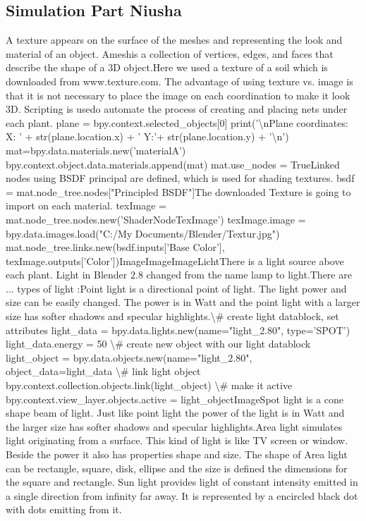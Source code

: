 \graphicspath{{members/nh/figures/}}

\subsection{Simulation Part Niusha}


A texture appears on the surface of the meshes and representing the look and material of an object. Ameshis a collection of vertices, edges, and faces that describe the shape of a 3D object.Here we used a texture of a soil which is downloaded from www.texture.com. The advantage of using texture vs. image is that it is not necessary to place the image on each coordination to make it look 3D. Scripting is usedo automate the process of creating and placing nets under each plant. plane = bpy.context.selected_objects[0] print('\textbackslash nPlane coordinates: X: ' + str(plane.location.x) + ' Y:'+ str(plane.location.y) + '\textbackslash n') mat=bpy.data.materials.new('materialA') bpy.context.object.data.materials.append(mat) mat.use_nodes = TrueLinked nodes using BSDF principal are defined, which is used for shading textures. bsdf = mat.node_tree.nodes["Principled BSDF"]The downloaded Texture is going to import on each material. texImage = mat.node_tree.nodes.new('ShaderNodeTexImage') texImage.image = bpy.data.images.load("C:/My Documents/Blender/Textur.jpg") mat.node_tree.links.new(bsdf.inputs['Base Color'], texImage.outputs['Color'])ImageImageImageLichtThere is a light source above each plant. Light in Blender 2.8 changed from the name lamp to light.There are ... types of light :Point light is a directional point of light. The light power and size can be easily changed. The power is in Watt and the point light with a larger size has softer shadows and specular highlights.\textbackslash# create light datablock, set attributes light_data = bpy.data.lights.new(name="light_2.80", type='SPOT') light_data.energy = 50 \textbackslash # create new object with our light datablock
 light_object = bpy.data.objects.new(name="light_2.80", object_data=light_data \textbackslash # link light object bpy.context.collection.objects.link(light_object) \textbackslash # make it active  bpy.context.view_layer.objects.active = light_objectImageSpot light is a cone shape beam of light. Just like point light the power of the light is in Watt and the larger size has softer shadows and specular highlights.Area light simulates light originating from a surface. This kind of light is like TV screen or window. Beside the power it also has properties shape and size. The shape of Area light can be rectangle, square, disk, ellipse and the size is defined the dimensions for the square and rectangle.
Sun light provides light of constant intensity emitted in a single direction from infinity far away. It is represented by a encircled black dot with dots emitting from it.
